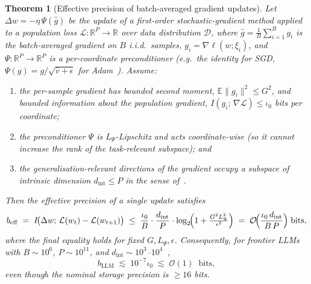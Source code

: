 \documentclass[11pt]{article}
\newtheorem{theorem}{Theorem}
\theoremstyle{definition}
\theoremstyle{remark}
\begin{document}
\begin{theorem}[Effective precision of batch-averaged gradient updates]
\label{prop:sgdbits}
Let $\Delta w=-\eta\,\Psi(\hat{g})$ be the update of a first-order
stochastic-gradient method applied to a population loss
$\mathcal{L}:\mathbb{R}^{P}\to\mathbb{R}$ over data distribution
$\mathcal{D}$, where $\hat{g}=\tfrac{1}{B}\sum_{i=1}^{B}g_{i}$ is the
batch-averaged gradient on $B$ i.i.d.\ samples,
$g_{i}=\nabla\ell(w;\xi_{i})$, and $\Psi:\mathbb{R}^{P}\to\mathbb{R}^{P}$
is a per-coordinate preconditioner (e.g.\ the identity for SGD,
$\Psi(g)=g/\sqrt{\hat{v}+\epsilon}$ for Adam~\cite{kingma2015adam}).
Assume:
\begin{enumerate}[label=\textup{(\alph*)},leftmargin=*,topsep=2pt,itemsep=1pt]
\item the per-sample gradient has bounded second moment,
  $\mathbb{E}\|g_{i}\|^{2}\le G^{2}$, and bounded
  information about the population gradient,
  $I(g_{i};\,\nabla\mathcal{L})\le \iota_{0}$ bits per coordinate;
\item the preconditioner $\Psi$ is $L_{\Psi}$-Lipschitz and acts
  coordinate-wise (so it cannot increase the rank of the
  task-relevant subspace); and
\item the generalisation-relevant directions of the gradient occupy a
  subspace of intrinsic dimension $d_{\mathrm{int}}\le P$ in the sense
  of~\cite{li2018measuring}.
\end{enumerate}
Then the effective precision of a single update satisfies
\[
  b_{\mathrm{eff}}
  \;=\; I\!\bigl(\Delta w;\,\mathcal{L}(w_{t})-\mathcal{L}(w_{t+1})\bigr)
  \;\le\;
  \frac{\iota_{0}}{B}\cdot\frac{d_{\mathrm{int}}}{P}\cdot
  \log_{2}\!\Bigl(1+\tfrac{G^{2}L_{\Psi}^{2}}{\epsilon^{2}}\Bigr)
  \;=\;\mathcal{O}\!\Bigl(\frac{\iota_{0}\,d_{\mathrm{int}}}{B\,P}\Bigr)
  \;\text{bits},
\]
where the final equality holds for fixed $G,L_{\Psi},\epsilon$.
Consequently, for frontier LLMs with $B\sim 10^{6}$, $P\sim 10^{11}$,
and $d_{\mathrm{int}}\sim 10^{3}$--$10^{4}$~\cite{li2018measuring},
\[
  b_{\mathrm{LLM}}\;\lesssim\;10^{-7}\iota_{0}\;\lesssim\;\mathcal{O}(1)
  \;\;\text{bits},
\]
even though the nominal storage precision is $\ge 16$ bits.
\end{theorem}
\end{document}
